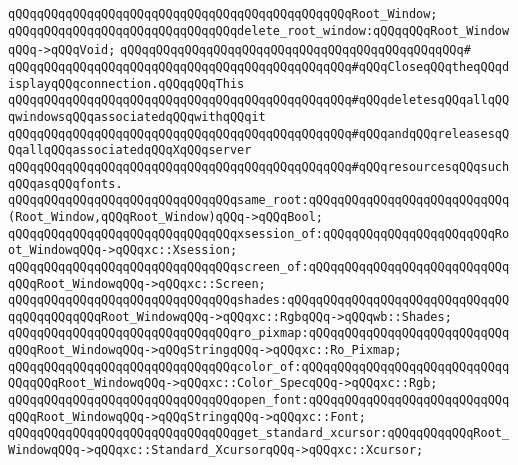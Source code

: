 \verb|qQQqqQQqqQQqqQQqqQQqqQQqqQQqqQQqqQQqqQQqqQQqqQQqRoot_Window;|\newline
\newline
\verb|qQQqqQQqqQQqqQQqqQQqqQQqqQQqqQQqdelete_root_window:qQQqqQQqRoot_WindowqQQq->qQQqVoid;|\newline
\verb|qQQqqQQqqQQqqQQqqQQqqQQqqQQqqQQqqQQqqQQqqQQqqQQq#|\newline
\verb|qQQqqQQqqQQqqQQqqQQqqQQqqQQqqQQqqQQqqQQqqQQqqQQq#qQQqCloseqQQqtheqQQqdisplayqQQqconnection.qQQqqQQqThis|\newline
\verb|qQQqqQQqqQQqqQQqqQQqqQQqqQQqqQQqqQQqqQQqqQQqqQQq#qQQqdeletesqQQqallqQQqwindowsqQQqassociatedqQQqwithqQQqit|\newline
\verb|qQQqqQQqqQQqqQQqqQQqqQQqqQQqqQQqqQQqqQQqqQQqqQQq#qQQqandqQQqreleasesqQQqallqQQqassociatedqQQqXqQQqserver|\newline
\verb|qQQqqQQqqQQqqQQqqQQqqQQqqQQqqQQqqQQqqQQqqQQqqQQq#qQQqresourcesqQQqsuchqQQqasqQQqfonts.|\newline
\newline
\newline
\verb|qQQqqQQqqQQqqQQqqQQqqQQqqQQqqQQqsame_root:qQQqqQQqqQQqqQQqqQQqqQQqqQQq(Root_Window,qQQqRoot_Window)qQQq->qQQqBool;|\newline
\newline
\verb|qQQqqQQqqQQqqQQqqQQqqQQqqQQqqQQqxsession_of:qQQqqQQqqQQqqQQqqQQqqQQqRoot_WindowqQQq->qQQqxc::Xsession;|\newline
\verb|qQQqqQQqqQQqqQQqqQQqqQQqqQQqqQQqscreen_of:qQQqqQQqqQQqqQQqqQQqqQQqqQQqqQQqRoot_WindowqQQq->qQQqxc::Screen;|\newline
\verb|qQQqqQQqqQQqqQQqqQQqqQQqqQQqqQQqshades:qQQqqQQqqQQqqQQqqQQqqQQqqQQqqQQqqQQqqQQqqQQqRoot_WindowqQQq->qQQqxc::RgbqQQq->qQQqwb::Shades;|\newline
\newline
\verb|qQQqqQQqqQQqqQQqqQQqqQQqqQQqqQQqro_pixmap:qQQqqQQqqQQqqQQqqQQqqQQqqQQqqQQqRoot_WindowqQQq->qQQqStringqQQq->qQQqxc::Ro_Pixmap;|\newline
\verb|qQQqqQQqqQQqqQQqqQQqqQQqqQQqqQQqcolor_of:qQQqqQQqqQQqqQQqqQQqqQQqqQQqqQQqqQQqRoot_WindowqQQq->qQQqxc::Color_SpecqQQq->qQQqxc::Rgb;|\newline
\verb|qQQqqQQqqQQqqQQqqQQqqQQqqQQqqQQqopen_font:qQQqqQQqqQQqqQQqqQQqqQQqqQQqqQQqRoot_WindowqQQq->qQQqStringqQQq->qQQqxc::Font;|\newline
\newline
\verb|qQQqqQQqqQQqqQQqqQQqqQQqqQQqqQQqget_standard_xcursor:qQQqqQQqqQQqRoot_WindowqQQq->qQQqxc::Standard_XcursorqQQq->qQQqxc::Xcursor;|\newline
